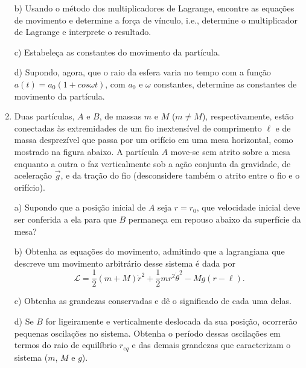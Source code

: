 \begin{enumerate}[start=1,label={\bfseries Q\arabic*.}]
b) Usando o método dos multiplicadores de Lagrange, encontre as equações de movimento e determine a força de vínculo, i.e., determine o multiplicador de Lagrange e interprete o resultado.

\resposta

c) Estabeleça as constantes do movimento da partícula.

\resposta

d) Supondo, agora, que o raio da esfera varia no tempo com a função $a(t) = a_{0} (1 + cos \omega t)$, com $a_{0}$ e $\omega$ constantes, determine as constantes de movimento da partícula.

\resposta


\item Duas partículas, $A$ e $B$, de massas $m$ e $M$ ($m \neq M$), respectivamente, estão conectadas às extremidades de um fio inextensível de comprimento $\ell$ e de massa desprezível que passa por um orifício em uma mesa horizontal, como mostrado na figura abaixo. A partícula $A$ move-se sem atrito sobre a mesa enquanto a outra o faz verticalmente sob a ação conjunta da gravidade, de aceleração $\vec{g}$, e da tração do fio (desconsidere também o atrito entre o fio e o orifício).


a) Supondo que a posição inicial de $A$ seja $r = r_{0}$, que velocidade inicial deve ser conferida a ela para que $B$ permaneça em repouso abaixo da superfície da mesa?

\resposta

b) Obtenha as equações do movimento, admitindo que a lagrangiana que descreve um movimento arbitrário desse sistema é dada por
$$
\mathcal{L}=\frac{1}{2}(m+M) \dot{r}^{2}+\frac{1}{2} m r^{2} \dot{\theta}^{2}-M g(r-\ell).
$$

\resposta

c) Obtenha as grandezas conservadas e dê o significado de cada uma delas.

\resposta

d) Se $B$ for ligeiramente e verticalmente deslocada da sua posição, ocorrerão pequenas oscilações no sistema. Obtenha o período dessas oscilações em termos do raio de equilíbrio $r_{eq}$ e das demais grandezas que caracterizam o sistema ($m$, $M$ e $g$).


\end{enumerate}
